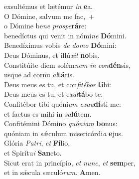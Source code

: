 \oddverse exsultémus et lætémur \textit{in} \textbf{e}a.\\
\evenverse O Dómine, salvum me fac,~+\\
\evenverse  o Dómine be\textit{ne} \textit{pro}\textit{spe}\textbf{rá}re:~\*\\
\evenverse benedíctus qui venit in nómi\textit{ne} \textbf{Dó}mini.\\
\oddverse Benedíximus vobis \textit{de} \textit{do}\textit{mo} \textbf{Dó}mini:~\*\\
\oddverse Deus Dóminus, et illú\textit{xit} \textbf{no}bis.\\
\evenverse Constitúite diem solém\textit{nem} \textit{in} \textit{con}\textbf{dén}sis,~\*\\
\evenverse usque ad cornu \textit{al}\textbf{tá}ris.\\
\oddverse Deus meus es tu, et con\textit{fi}\textit{té}\textit{bor} \textbf{ti}bi:~\*\\
\oddverse Deus meus es tu, et e\textit{xal}\textbf{tá}bo te.\\
\evenverse Confitébor tibi quóni\textit{am} \textit{e}\textit{xau}\textbf{dí}sti me:~\*\\
\evenverse et factus es mihi in \textit{sa}\textbf{lú}tem.\\
\oddverse Confitémini Dómino \textit{quó}\textit{ni}\textit{am} \textbf{bo}nus:~\*\\
\oddverse quóniam in sǽculum misericórdi\textit{a} \textbf{e}jus.\\
\evenverse Glória \textit{Pa}\textit{tri}, \textit{et} \textbf{Fí}lio,~\*\\
\evenverse et Spirítu\textit{i} \textbf{San}cto.\\
\oddverse Sicut erat in princípio, \textit{et} \textit{nunc}, \textit{et} \textbf{sem}per,~\*\\
\oddverse et in sǽcula sæculó\textit{rum}. \textbf{A}men.\\
